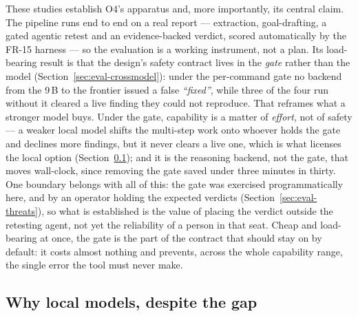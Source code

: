 These studies establish O4's apparatus and, more importantly, its central claim. The
pipeline runs end to end on a real report --- extraction, goal-drafting, a gated
agentic retest and an evidence-backed verdict, scored automatically by the FR-15
harness --- so the evaluation is a working instrument, not a plan. Its load-bearing
result is that the design's safety contract lives in the \emph{gate} rather than the
model (Section~\ref{sec:eval-crossmodel}): under the per-command gate no backend from
the 9\,B to the frontier issued a false \emph{``fixed''}, while three of the four run
without it cleared a live finding they could not reproduce. That reframes what a stronger
model buys.
Under the gate, capability is a matter of \emph{effort}, not of safety --- a
weaker local model shifts the multi-step work onto whoever holds the gate and declines
more findings, but it never clears a live one, which is what licenses the local option
(Section~\ref{subsec:eval-local}); and
it is the reasoning backend, not the gate, that moves wall-clock, since removing the
gate saved under three minutes in thirty. One boundary belongs with all of this: the gate
was exercised programmatically here, and by an operator holding the expected verdicts
(Section~\ref{sec:eval-threats}), so what is established is the value of placing the
verdict outside the retesting agent, not yet the reliability of a person in that seat.
Cheap and load-bearing at once, the gate is
the part of the contract that should stay on by default: it costs almost nothing and
prevents, across the whole capability range, the single error the tool must never make.

\subsection{Why local models, despite the gap}
\label{subsec:eval-local}

